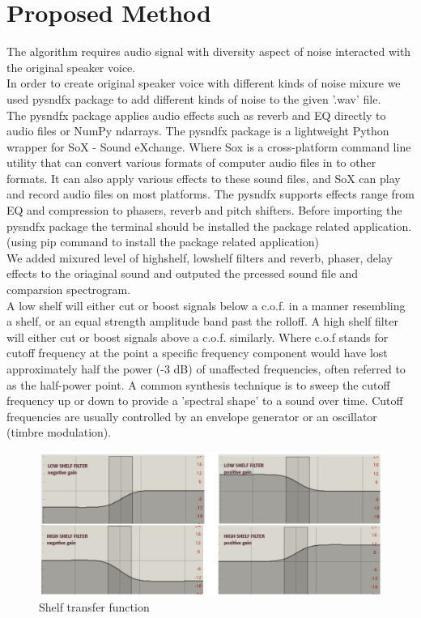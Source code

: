 \documentclass[runningheads,a4paper]{llncs}
\begin{document}
\section{Proposed Method}
The algorithm requires audio signal with diversity aspect of noise interacted with the original speaker voice.\\
In order to create original speaker voice with different kinds of noise mixure we used pysndfx package \cite{19} to add different kinds of noise to the given '.wav' file. \\
The pysndfx package applies audio effects such as reverb and EQ directly to audio files or NumPy ndarrays. The pysndfx package is a lightweight Python wrapper for SoX - Sound eXchange. Where Sox is a cross-platform command line utility that can convert various formats of computer audio files in to other formats. It can also apply various effects to these sound files, and SoX can play and record audio files on most platforms. \cite{20} The pysndfx supports effects range from EQ and compression to phasers, reverb and pitch shifters. Before importing the pysndfx package the terminal should be installed the package related application. (using pip command to install the package related application)\\

We added mixured level of highshelf, lowshelf filters and reverb, phaser, delay effects to the oriaginal sound and outputed the prcessed sound file and comparsion spectrogram.\\

A low shelf will either cut or boost signals below a c.o.f. in a manner resembling a shelf, or an equal strength amplitude band past the rolloff. A high shelf filter will either cut or boost signals above a c.o.f. similarly.
Where c.o.f stands for cutoff frequency at the point a specific frequency component would have lost approximately half the power (-3 dB) of unaffected frequencies, often referred to as the half-power point. A common synthesis technique is to sweep the cutoff frequency up or down to provide a 'spectral shape' to a sound over time. Cutoff frequencies are usually controlled by an envelope generator or an oscillator (timbre modulation).\cite{21}\\

\begin{figure}[H]
\includegraphics[scale=0.15]{HLshelf.jpeg}
\caption{Shelf transfer function \cite{21}}
\label{fig:framework}
\end{figure}
\end{document}
